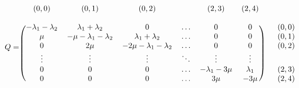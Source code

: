 \begin{frame}
    \begin{equation*}
        Q = 
        \begin{blockarray}{cccccccc}
            (0, 0) & (0, 1) & (0, 2) & & (2, 3) & (2, 4) & & \\
            & & & & & & & &\\
            \begin{block}{(cccccc)cc}
                -\lambda_1 - \lambda_2 & \lambda_1 + \lambda_2 & 0 & \dots & 0 & 0 & & (0,0) \\
                \mu & -\mu - \lambda_1 - \lambda_2 & \lambda_1 + \lambda_2 & \dots & 0 & 0 & & (0,1) \\
                0 & 2\mu & -2\mu - \lambda_1 - \lambda_2 & \dots & 0 & 0 & & (0,2) \\
                \vdots & \vdots & \vdots & \ddots & \vdots & \vdots & \\
                0 & 0 & 0 & \dots & -\lambda_1 - 3\mu & \lambda_1 & & (2,3)\\
                0 & 0 & 0 & \dots & 3\mu & -3\mu & & (2,4) \\
            \end{block}
        \end{blockarray}    
    \end{equation*}

\end{frame}
